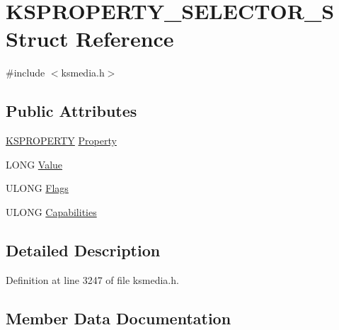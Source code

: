 \hypertarget{struct_k_s_p_r_o_p_e_r_t_y___s_e_l_e_c_t_o_r___s}{}\section{K\+S\+P\+R\+O\+P\+E\+R\+T\+Y\+\_\+\+S\+E\+L\+E\+C\+T\+O\+R\+\_\+S Struct Reference}
\label{struct_k_s_p_r_o_p_e_r_t_y___s_e_l_e_c_t_o_r___s}


{\ttfamily \#include $<$ksmedia.\+h$>$}

\subsection*{Public Attributes}
\begin{DoxyCompactItemize}
\item 
\hyperlink{ks_8h_a4392f77c74e868d813d46c39ada4d660}{K\+S\+P\+R\+O\+P\+E\+R\+TY} \hyperlink{struct_k_s_p_r_o_p_e_r_t_y___s_e_l_e_c_t_o_r___s_abe40cd95923a9f32ebb52c69b022b2f7}{Property}
\item 
L\+O\+NG \hyperlink{struct_k_s_p_r_o_p_e_r_t_y___s_e_l_e_c_t_o_r___s_a38456d9c35941848f0a238b8863c00f3}{Value}
\item 
U\+L\+O\+NG \hyperlink{struct_k_s_p_r_o_p_e_r_t_y___s_e_l_e_c_t_o_r___s_a859996cbd230c31cc30b4736fa1ad9c4}{Flags}
\item 
U\+L\+O\+NG \hyperlink{struct_k_s_p_r_o_p_e_r_t_y___s_e_l_e_c_t_o_r___s_af73dac4385bdc27851266e377a5f75b7}{Capabilities}
\end{DoxyCompactItemize}


\subsection{Detailed Description}


Definition at line 3247 of file ksmedia.\+h.



\subsection{Member Data Documentation}
